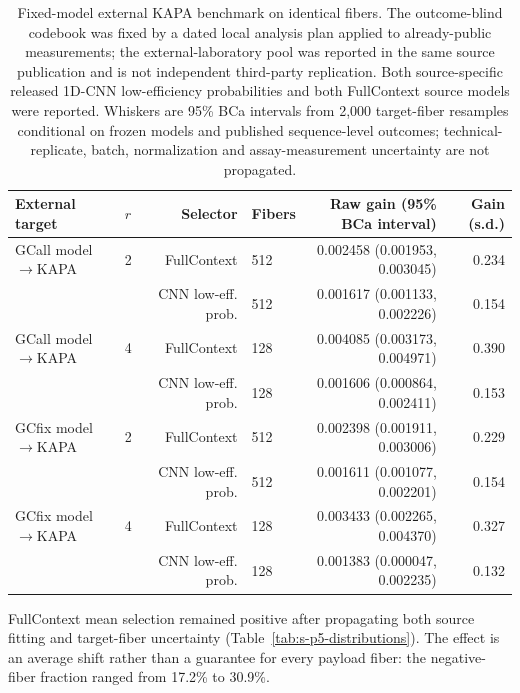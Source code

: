 \documentclass[10pt]{article}
\begin{document}
\begin{table}[H]
\centering
\scriptsize
\begin{tabular}{@{}llrlrr@{}}
\toprule
External target & $r$ & Selector & Fibers & Raw gain (95\% BCa interval) & Gain (s.d.) \\
\midrule
GCall model$\rightarrow$KAPA & 2 & FullContext & 512 & 0.002458 (0.001953, 0.003045) & 0.234 \\
 &  & CNN low-eff. prob. & 512 & 0.001617 (0.001133, 0.002226) & 0.154 \\
GCall model$\rightarrow$KAPA & 4 & FullContext & 128 & 0.004085 (0.003173, 0.004971) & 0.390 \\
 &  & CNN low-eff. prob. & 128 & 0.001606 (0.000864, 0.002411) & 0.153 \\
GCfix model$\rightarrow$KAPA & 2 & FullContext & 512 & 0.002398 (0.001911, 0.003006) & 0.229 \\
 &  & CNN low-eff. prob. & 512 & 0.001611 (0.001077, 0.002201) & 0.154 \\
GCfix model$\rightarrow$KAPA & 4 & FullContext & 128 & 0.003433 (0.002265, 0.004370) & 0.327 \\
 &  & CNN low-eff. prob. & 128 & 0.001383 (0.000047, 0.002235) & 0.132 \\
\bottomrule
\end{tabular}
\caption{Fixed-model external KAPA benchmark on identical fibers. The outcome-blind codebook was fixed by a dated local analysis plan applied to already-public measurements; the external-laboratory pool was reported in the same source publication and is not independent third-party replication. Both source-specific released 1D-CNN low-efficiency probabilities and both FullContext source models were reported. Whiskers are 95\% BCa intervals from 2,000 target-fiber resamples conditional on frozen models and published sequence-level outcomes; technical-replicate, batch, normalization and assay-measurement uncertainty are not propagated.}
\label{tab:s-external-sota}
\end{table}

FullContext mean selection remained positive after propagating both source fitting and target-fiber uncertainty (Table~\ref{tab:s-p5-distributions}). The effect is an average shift rather than a guarantee for every payload fiber: the negative-fiber fraction ranged from 17.2\% to 30.9\%.
\end{document}
